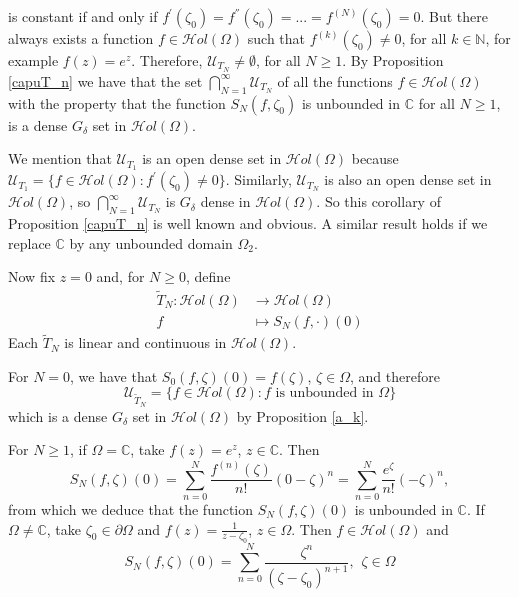 \documentclass[11pt,twoside,a4paper]{article}
\theoremstyle{remark}
\def\d{\delta}
\newcommand{\hol}{{\mathcal Hol}}
\newcommand{\holo}{{\mathcal Hol}(\Omega)}
\newcommand{\ttn}{\widetilde{T}_N}
\begin{document}
is constant if and only if $f^{'}(\zeta_0)= f^{''}(\zeta_0)=...=f^{(N)}(\zeta_0)=0$. But there always exists a function $f \in \holo$ such that $f^{(k)}(\zeta_0) \neq 0$, for all $k \in \mathbb{N}$, for example $f(z)= e^z$. Therefore, $\mathcal{U}_{T_N} \neq \emptyset$, for all $N \geq 1$. By Proposition \ref{capuT_n} we have that the set $\bigcap\limits_{N=1}^{\infty}\mathcal{U}_{T_N}$ of all the functions $f \in \holo$ with the property that the function $S_N(f, \zeta_0)$ is unbounded in $\mathbb{C}$ for all $N \geq 1$, is a dense $G_\d$ set in $\holo$. \\
\par
We mention that $\mathcal{U}_{T_1}$ is an open dense set in $\hol(\Omega)$ because $\mathcal{U}_{T_1}= \{f \in \holo : f^{'}(\zeta_0) \neq 0\}$. Similarly, $\mathcal{U}_{T_N} $ is also an open dense set in $\holo$, so $\bigcap\limits_{N=1}^{\infty} \mathcal{U}_{T_N}$ is $G_\d$ dense in $\holo$. So this corollary of Proposition \ref{capuT_n} is well known and obvious. A similar result holds if we replace $\mathbb{C}$ by any unbounded domain $\Omega_2$.
\par
Now fix $z=0$ and, for $N \geq 0$, define
\begin{align*}
  \ttn :\holo & \rightarrow \holo \\
  f & \mapsto S_N(f, \cdot)(0)
\end{align*}
Each $\ttn$ is linear and continuous in $\holo$. \par
For $N=0$, we have that $S_0(f,\zeta)(0)=f(\zeta)$, $\zeta \in \Omega$, and therefore
\begin{equation*}
  \mathcal{U}_{\ttn}= \big\{ f\in \holo: f \text{ is unbounded in } \Omega \big\}
\end{equation*}
which is a dense $G_\d$ set in $\holo $ by Proposition \ref{a_k}. \par
For $N \geq 1$, if $\Omega = \mathbb{C}$, take $f(z)= e^z$, $z \in \mathbb{C}$. Then
\begin{equation*}
  S_N(f, \zeta)(0)= \sum_{n=0}^{N}\frac{f^{(n)}(\zeta)}{n!}(0-\zeta)^n=\sum_{n=0}^{N}\frac{e ^{\zeta}}{n!}(-\zeta)^n,
\end{equation*}
from which we deduce that the function $S_N(f,\zeta)(0)$ is unbounded in $\mathbb{C}$. If $\Omega \neq \mathbb{C}$, take $\zeta_0 \in \partial \Omega$ and $f(z)= \tfrac{1}{z-\zeta_0}$, $z \in \Omega$. Then $f \in \holo$ and
\begin{equation*}
  S_N(f,\zeta)(0)= \sum_{n=0}^{N} \frac{\zeta ^n}{(\zeta-\zeta_0)^{n+1}}, \hspace{5pt} \zeta \in \Omega
\end{equation*}
\end{document}
